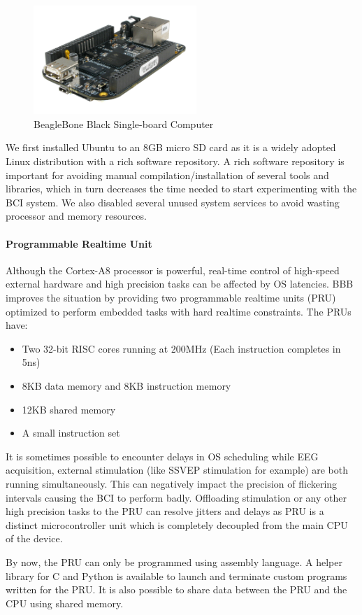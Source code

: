 \documentclass[12pt]{article}
\newcommand\mysubsubsubsection[1]{\paragraph{#1}\hspace{0pt}}
\numberwithin{equation}{section}
\numberwithin{figure}{section}
\numberwithin{table}{section}
\begin{document}
\begin{figure}[ht]
    \centering
    \includegraphics[width=0.55\textwidth]{images/bbb}
    \caption{BeagleBone Black Single-board Computer}
    \label{fig:bbb}
\end{figure}

\par{
    We first installed Ubuntu to an 8GB micro SD card as it is a widely adopted Linux distribution with a rich software repository.
    A rich software repository is important for avoiding manual compilation/installation of several tools and libraries,
    which in turn decreases the time needed to start experimenting with the BCI system. We also disabled
    several unused system services to avoid wasting processor and memory resources.
}

\mysubsubsubsection{Programmable Realtime Unit}
\par{
    Although the Cortex-A8 processor is powerful, real-time control of high-speed external hardware
    and high precision tasks can be affected by OS latencies. BBB improves the
    situation by providing two programmable realtime units (PRU) optimized to perform embedded tasks
    with hard realtime constraints. The PRUs have:
    \begin{itemize}
        \item Two 32-bit RISC cores running at 200MHz (Each instruction completes in 5ns)
        \item 8KB data memory and 8KB instruction memory
        \item 12KB shared memory
        \item A small instruction set
    \end{itemize}
    It is sometimes possible to encounter delays in OS scheduling while EEG
    acquisition, external stimulation (like SSVEP stimulation for example) are both running simultaneously. This can negatively
    impact the precision of flickering intervals causing the BCI to perform badly.
    Offloading stimulation or any other high precision tasks to the
    PRU can resolve jitters and delays as PRU is a distinct
    microcontroller unit which is completely decoupled from the main CPU of the device.
}
\par{
    By now, the PRU can only be programmed using assembly language. A helper library
    for C and Python is available to launch and terminate custom programs written for the PRU.
    It is also possible to share data between the PRU and the CPU using shared memory.
}
\end{document}
